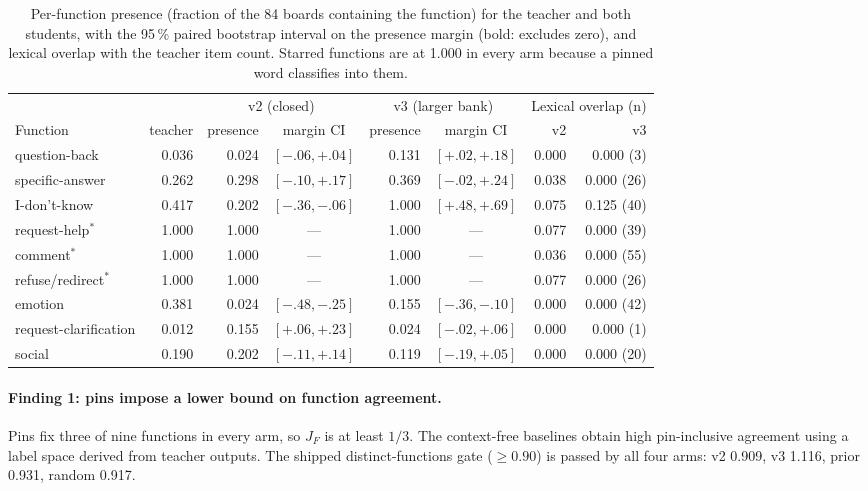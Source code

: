 \begin{table}[t]
\centering
\small
\caption{Per-function presence (fraction of the 84 boards containing the
function) for the teacher and both students, with the 95\,\% paired
bootstrap interval on the presence margin (bold: excludes zero), and
lexical overlap with the teacher item count. Starred functions are at
1.000 in every arm because a pinned word classifies into them.}
\label{tab:perfn}
\footnotesize
\setlength{\tabcolsep}{4pt}
\begin{tabular}{@{}lrrcrcrr@{}}
\toprule
 & & \multicolumn{2}{c}{v2 (closed)} & \multicolumn{2}{c}{v3 (larger bank)} & \multicolumn{2}{c}{Lexical overlap (n)} \\
\cmidrule(lr){3-4}\cmidrule(lr){5-6}\cmidrule(lr){7-8}
Function & teacher & presence & margin CI & presence & margin CI & v2 & v3 \\
\midrule
question-back & 0.036 & 0.024 & $[-.06,+.04]$ & 0.131 & $\mathbf{[+.02,+.18]}$ & 0.000 & 0.000 (3) \\
specific-answer & 0.262 & 0.298 & $[-.10,+.17]$ & 0.369 & $[-.02,+.24]$ & 0.038 & 0.000 (26) \\
I-don't-know & 0.417 & 0.202 & $\mathbf{[-.36,-.06]}$ & 1.000 & $\mathbf{[+.48,+.69]}$ & 0.075 & 0.125 (40) \\
request-help$^\ast$ & 1.000 & 1.000 & --- & 1.000 & --- & 0.077 & 0.000 (39) \\
comment$^\ast$ & 1.000 & 1.000 & --- & 1.000 & --- & 0.036 & 0.000 (55) \\
refuse/redirect$^\ast$ & 1.000 & 1.000 & --- & 1.000 & --- & 0.077 & 0.000 (26) \\
emotion & 0.381 & 0.024 & $\mathbf{[-.48,-.25]}$ & 0.155 & $\mathbf{[-.36,-.10]}$ & 0.000 & 0.000 (42) \\
request-clarification & 0.012 & 0.155 & $\mathbf{[+.06,+.23]}$ & 0.024 & $[-.02,+.06]$ & 0.000 & 0.000 (1) \\
social & 0.190 & 0.202 & $[-.11,+.14]$ & 0.119 & $[-.19,+.05]$ & 0.000 & 0.000 (20) \\
\bottomrule
\end{tabular}
\end{table}

\paragraph{Finding 1: pins impose a lower bound on function agreement.}
Pins fix three of nine functions in every arm, so $J_F$ is at least $1/3$.
The context-free baselines obtain high pin-inclusive agreement using a
label space derived from teacher outputs. The shipped distinct-functions
gate ($\ge 0.90$) is passed by all four arms: v2 0.909, v3 1.116,
prior 0.931, random 0.917.

